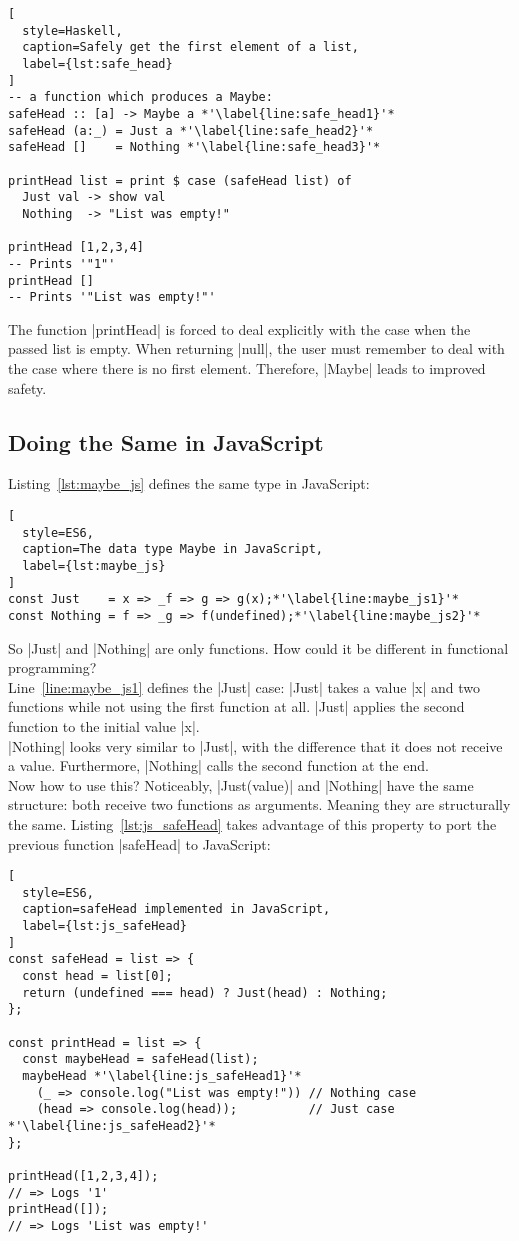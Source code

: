 \begin{lstlisting}[
  style=Haskell,
  caption=Safely get the first element of a list,
  label={lst:safe_head}
]
-- a function which produces a Maybe:
safeHead :: [a] -> Maybe a *'\label{line:safe_head1}'*
safeHead (a:_) = Just a *'\label{line:safe_head2}'*
safeHead []    = Nothing *'\label{line:safe_head3}'*

printHead list = print $ case (safeHead list) of 
  Just val -> show val
  Nothing  -> "List was empty!"

printHead [1,2,3,4]
-- Prints '"1"'
printHead []
-- Prints '"List was empty!"'
\end{lstlisting}

The function |printHead| is forced to deal explicitly with the case when the passed
list is empty. When returning |null|, the user must remember to deal with
the case where there is no first element. Therefore, |Maybe| leads to improved safety.

\subsection{Doing the Same in JavaScript} %
\label{sub:Doing the same in JavaScript}
Listing~\ref{lst:maybe_js} defines the same type in JavaScript:
\begin{lstlisting}[
  style=ES6,
  caption=The data type Maybe in JavaScript,
  label={lst:maybe_js}
]
const Just    = x => _f => g => g(x);*'\label{line:maybe_js1}'*
const Nothing = f => _g => f(undefined);*'\label{line:maybe_js2}'*
\end{lstlisting}

So |Just| and |Nothing| are only functions. How could it be different in
functional programming? \\ 
Line~\ref{line:maybe_js1} defines the |Just| case:
|Just| takes a value |x| and two functions while not using the first function
at all. |Just| applies the second function to the initial value |x|. \\ 
|Nothing| looks very similar to |Just|, with the difference that it does not
receive a value. Furthermore, |Nothing| calls the second function at the end.\\ 
Now how to use this? Noticeably, |Just(value)| and |Nothing| have the same
structure: both receive two functions as arguments. Meaning they are
structurally the same. Listing~\ref{lst:js_safeHead} takes advantage of this
property to port the previous function |safeHead| to JavaScript:

\begin{lstlisting}[
  style=ES6,
  caption=safeHead implemented in JavaScript,
  label={lst:js_safeHead}
]
const safeHead = list => {
  const head = list[0];
  return (undefined === head) ? Just(head) : Nothing;
};

const printHead = list => {
  const maybeHead = safeHead(list);
  maybeHead *'\label{line:js_safeHead1}'*
    (_ => console.log("List was empty!")) // Nothing case
    (head => console.log(head));          // Just case *'\label{line:js_safeHead2}'*
};

printHead([1,2,3,4]);
// => Logs '1'
printHead([]);
// => Logs 'List was empty!'
\end{lstlisting}

